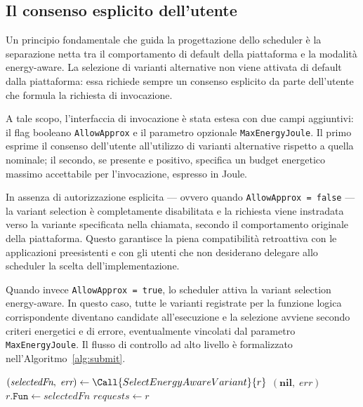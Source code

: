 \subsection{Il consenso esplicito dell'utente}
\label{sec:scheduler:consenso}

Un principio fondamentale che guida la progettazione dello scheduler è la
separazione netta tra il comportamento di default della piattaforma e la
modalità energy-aware. La selezione di varianti alternative non viene attivata di default dalla piattaforma:
essa richiede sempre un consenso esplicito da parte dell'utente che
formula la richiesta di invocazione.

A tale scopo, l'interfaccia di invocazione è stata estesa con due campi
aggiuntivi: il flag booleano \texttt{AllowApprox} e il parametro
opzionale \texttt{MaxEnergyJoule}. Il primo esprime il consenso
dell'utente all'utilizzo di varianti alternative rispetto a quella
nominale; il secondo, se presente e positivo, specifica un budget
energetico massimo accettabile per l'invocazione, espresso in Joule.

In assenza di autorizzazione esplicita — ovvero quando
\texttt{AllowApprox = false} — la variant selection è completamente disabilitata e la
richiesta viene instradata verso la variante specificata nella chiamata,
secondo il comportamento originale della piattaforma. Questo garantisce la
piena compatibilità retroattiva con le applicazioni preesistenti e con gli
utenti che non desiderano delegare allo scheduler la scelta
dell'implementazione.

Quando invece \texttt{AllowApprox = true}, lo scheduler attiva la variant
selection energy-aware. In questo caso, tutte le varianti registrate per
la funzione logica corrispondente diventano candidate all'esecuzione e la
selezione avviene secondo criteri energetici e di errore,
eventualmente vincolati dal parametro \texttt{MaxEnergyJoule}. Il flusso
di controllo ad alto livello è formalizzato nell'Algoritmo~\ref{alg:submit}.

\begin{algorithm}[htbp]
\caption{\texttt{SubmitRequest} con variant selection opt-in}
\label{alg:submit}
\begin{algorithmic}[1]
        \State $(\textit{selectedFn},\; \textit{err}) \gets
               \Call{SelectEnergyAwareVariant}{r}$
            \State \Return $(\textbf{nil},\; \textit{err})$
        \EndIf
            \State $r.\texttt{Fun} \gets \textit{selectedFn}$
        \EndIf
    \EndIf
    \State $\textit{requests} \leftarrow r$
    \State \Return {}
\EndFunction
\end{algorithmic}
\end{algorithm}

